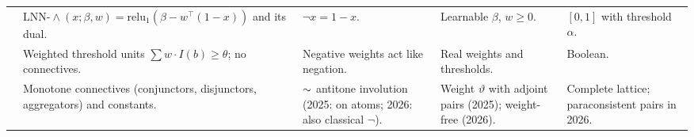 {\begin{longtable}{@{}p{}p{}p{}p{}p{}@{}}
            \cite{SenCRG22}                                  & $\mathrm{LNN}\text{-}\land(x;\beta,w)=\mathrm{relu}_1(\beta-w^{\top}(1-x))$ and its dual.                                                          & $\neg x=1-x$.                                                                                      & Learnable $\beta$, $w\geq0$.                                                                    & $[0,1]$ with threshold $\alpha$.                      \\
            \cite{Antic24}                                   & Weighted threshold units $\sum w\cdot I(b)\geq\theta$; no connectives.                                                                             & Negative weights act like negation.                                                                & Real weights and thresholds.                                                                    & Boolean.                                              \\
            \cite{KettmannHS25,KettmannSHS26arxiv}           & Monotone connectives (conjunctors, disjunctors, aggregators) and constants.                                                                        & $\mathord{\sim} $ antitone involution (2025: on atoms; 2026: also classical $\neg$).                      & Weight $\vartheta$ with adjoint pairs (2025); weight-free (2026).                               & Complete lattice; paraconsistent pairs in 2026.       \\
        \end{longtable}

}
